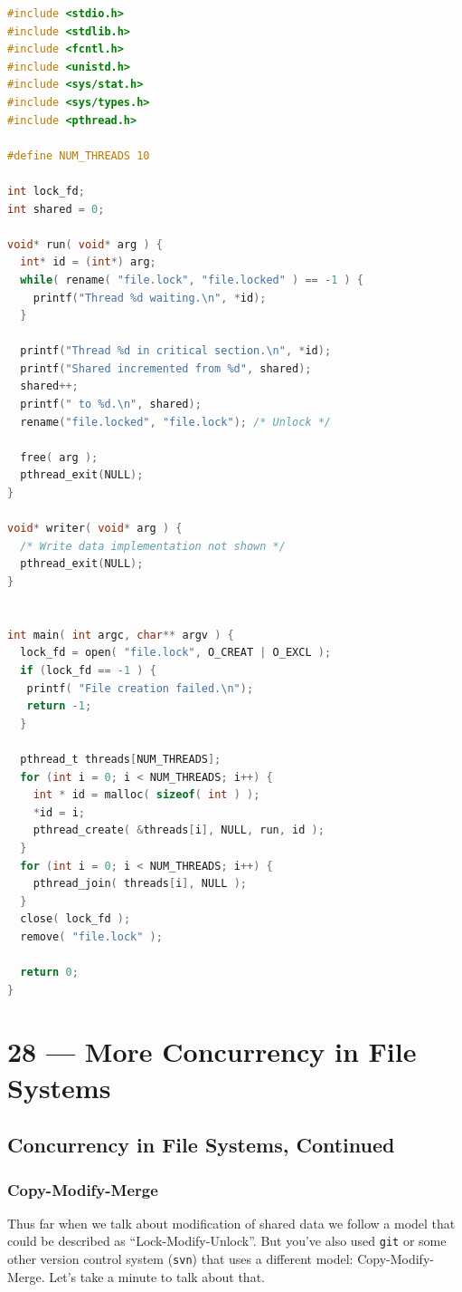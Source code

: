 \documentclass[a4paper]{report}
\begin{document}
\begin{lstlisting}[language=C]
#include <stdio.h>
#include <stdlib.h>
#include <fcntl.h>
#include <unistd.h>
#include <sys/stat.h>
#include <sys/types.h>
#include <pthread.h>

#define NUM_THREADS 10

int lock_fd;
int shared = 0;

void* run( void* arg ) {
  int* id = (int*) arg;
  while( rename( "file.lock", "file.locked" ) == -1 ) {
    printf("Thread %d waiting.\n", *id); 
  }

  printf("Thread %d in critical section.\n", *id);
  printf("Shared incremented from %d", shared);
  shared++;
  printf(" to %d.\n", shared);
  rename("file.locked", "file.lock"); /* Unlock */

  free( arg );
  pthread_exit(NULL);
}

void* writer( void* arg ) {
  /* Write data implementation not shown */
  pthread_exit(NULL);
}


int main( int argc, char** argv ) {
  lock_fd = open( "file.lock", O_CREAT | O_EXCL );  
  if (lock_fd == -1 ) {
   printf( "File creation failed.\n");
   return -1;
  }

  pthread_t threads[NUM_THREADS];
  for (int i = 0; i < NUM_THREADS; i++) {
    int * id = malloc( sizeof( int ) );
    *id = i;
    pthread_create( &threads[i], NULL, run, id );
  }
  for (int i = 0; i < NUM_THREADS; i++) {
    pthread_join( threads[i], NULL );
  }
  close( lock_fd );
  remove( "file.lock" );

  return 0;
}
\end{lstlisting}








\chapter*{28 --- More Concurrency in File Systems}


\section*{Concurrency in File Systems, Continued}


\subsection*{Copy-Modify-Merge}
Thus far when we talk about modification of shared data we follow a model that could be described as ``Lock-Modify-Unlock''. But you've also used \texttt{git} or some other version control system (\texttt{svn}) that uses a different model: Copy-Modify-Merge. Let's take a minute to talk about that.
\end{document}
